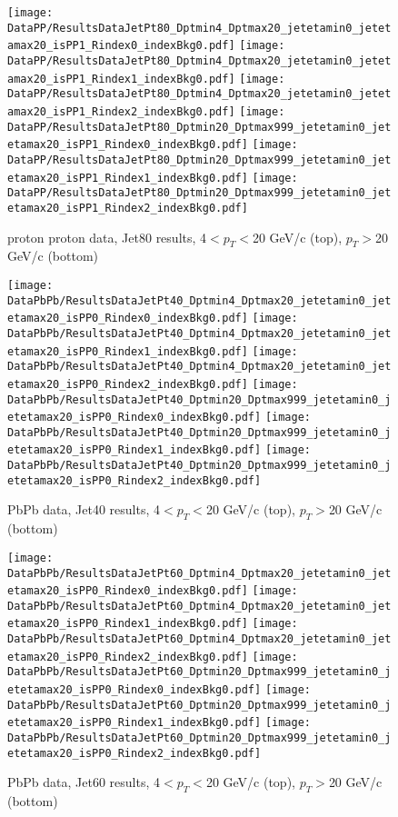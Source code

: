 \documentclass{article}
\begin{document}
\begin{figure}
    \centering
    \texttt{[image: DataPP/ResultsDataJetPt80\_Dptmin4\_Dptmax20\_jetetamin0\_jetetamax20\_isPP1\_Rindex0\_indexBkg0.pdf]}
    \texttt{[image: DataPP/ResultsDataJetPt80\_Dptmin4\_Dptmax20\_jetetamin0\_jetetamax20\_isPP1\_Rindex1\_indexBkg0.pdf]}
    \texttt{[image: DataPP/ResultsDataJetPt80\_Dptmin4\_Dptmax20\_jetetamin0\_jetetamax20\_isPP1\_Rindex2\_indexBkg0.pdf]}
    \texttt{[image: DataPP/ResultsDataJetPt80\_Dptmin20\_Dptmax999\_jetetamin0\_jetetamax20\_isPP1\_Rindex0\_indexBkg0.pdf]}
    \texttt{[image: DataPP/ResultsDataJetPt80\_Dptmin20\_Dptmax999\_jetetamin0\_jetetamax20\_isPP1\_Rindex1\_indexBkg0.pdf]}
    \texttt{[image: DataPP/ResultsDataJetPt80\_Dptmin20\_Dptmax999\_jetetamin0\_jetetamax20\_isPP1\_Rindex2\_indexBkg0.pdf]}
    \caption{proton proton data, Jet80 results, 4$<p_{T}<$20 GeV/c (top), $p_{T}>$20 GeV/c (bottom) }
    \label{simulationfigure}
\end{figure}


\begin{figure}
    \centering
    \texttt{[image: DataPbPb/ResultsDataJetPt40\_Dptmin4\_Dptmax20\_jetetamin0\_jetetamax20\_isPP0\_Rindex0\_indexBkg0.pdf]}
    \texttt{[image: DataPbPb/ResultsDataJetPt40\_Dptmin4\_Dptmax20\_jetetamin0\_jetetamax20\_isPP0\_Rindex1\_indexBkg0.pdf]}
    \texttt{[image: DataPbPb/ResultsDataJetPt40\_Dptmin4\_Dptmax20\_jetetamin0\_jetetamax20\_isPP0\_Rindex2\_indexBkg0.pdf]}
    \texttt{[image: DataPbPb/ResultsDataJetPt40\_Dptmin20\_Dptmax999\_jetetamin0\_jetetamax20\_isPP0\_Rindex0\_indexBkg0.pdf]}
    \texttt{[image: DataPbPb/ResultsDataJetPt40\_Dptmin20\_Dptmax999\_jetetamin0\_jetetamax20\_isPP0\_Rindex1\_indexBkg0.pdf]}
    \texttt{[image: DataPbPb/ResultsDataJetPt40\_Dptmin20\_Dptmax999\_jetetamin0\_jetetamax20\_isPP0\_Rindex2\_indexBkg0.pdf]}
    \caption{PbPb data, Jet40 results, 4$<p_{T}<$20 GeV/c (top), $p_{T}>$20 GeV/c (bottom) }
    \label{simulationfigure}
\end{figure}

\begin{figure}
    \centering
    \texttt{[image: DataPbPb/ResultsDataJetPt60\_Dptmin4\_Dptmax20\_jetetamin0\_jetetamax20\_isPP0\_Rindex0\_indexBkg0.pdf]}
    \texttt{[image: DataPbPb/ResultsDataJetPt60\_Dptmin4\_Dptmax20\_jetetamin0\_jetetamax20\_isPP0\_Rindex1\_indexBkg0.pdf]}
    \texttt{[image: DataPbPb/ResultsDataJetPt60\_Dptmin4\_Dptmax20\_jetetamin0\_jetetamax20\_isPP0\_Rindex2\_indexBkg0.pdf]}
    \texttt{[image: DataPbPb/ResultsDataJetPt60\_Dptmin20\_Dptmax999\_jetetamin0\_jetetamax20\_isPP0\_Rindex0\_indexBkg0.pdf]}
    \texttt{[image: DataPbPb/ResultsDataJetPt60\_Dptmin20\_Dptmax999\_jetetamin0\_jetetamax20\_isPP0\_Rindex1\_indexBkg0.pdf]}
    \texttt{[image: DataPbPb/ResultsDataJetPt60\_Dptmin20\_Dptmax999\_jetetamin0\_jetetamax20\_isPP0\_Rindex2\_indexBkg0.pdf]}
    \caption{PbPb data, Jet60 results, 4$<p_{T}<$20 GeV/c (top), $p_{T}>$20 GeV/c (bottom) }
    \label{simulationfigure}
\end{figure}
\end{document}
